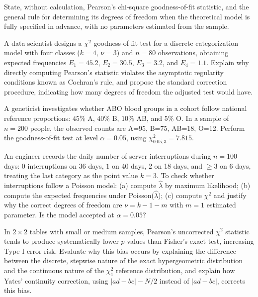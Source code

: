 \begin{problema}\label{prob:3f1ec07}
State, without calculation, Pearson's chi-square goodness-of-fit statistic, and the general rule for determining its degrees of freedom when the theoretical model is fully specified in advance, with no parameters estimated from the sample.
\end{problema}

\begin{problema}\label{prob:d4859df}
A data scientist designs a $\chi^2$ goodness-of-fit test for a discrete categorization model with four classes ($k=4$, $\nu=3$) and $n=80$ observations, obtaining expected frequencies $E_1=45.2$, $E_2=30.5$, $E_3=3.2$, and $E_4=1.1$. Explain why directly computing Pearson's statistic violates the asymptotic regularity conditions known as Cochran's rule, and propose the standard correction procedure, indicating how many degrees of freedom the adjusted test would have.
\end{problema}

\begin{problema}\label{prob:da2eb15}
A geneticist investigates whether ABO blood groups in a cohort follow national reference proportions: $45\%$ A, $40\%$ B, $10\%$ AB, and $5\%$ O. In a sample of $n=200$ people, the observed counts are A=95, B=75, AB=18, O=12. Perform the goodness-of-fit test at level $\alpha=0.05$, using $\chi^2_{0.05,3}=7.815$.
\end{problema}

\begin{problema}\label{prob:d6f0154}
An engineer records the daily number of server interruptions during $n=100$ days: $0$ interruptions on 36 days, $1$ on 40 days, $2$ on 18 days, and $\ge3$ on 6 days, treating the last category as the point value $k=3$. To check whether interruptions follow a Poisson model: (a) compute $\hat\lambda$ by maximum likelihood; (b) compute the expected frequencies under Poisson($\hat\lambda$); (c) compute $\chi^2$ and justify why the correct degrees of freedom are $\nu=k-1-m$ with $m=1$ estimated parameter. Is the model accepted at $\alpha=0.05$?
\end{problema}

\begin{problema}\label{prob:f622374}
In $2\times2$ tables with small or medium samples, Pearson's uncorrected $\chi^2$ statistic tends to produce systematically lower $p$-values than Fisher's exact test, increasing Type I error risk. Evaluate why this bias occurs by explaining the difference between the discrete, stepwise nature of the exact hypergeometric distribution and the continuous nature of the $\chi^2_1$ reference distribution, and explain how Yates' continuity correction, using $|ad-bc|-N/2$ instead of $|ad-bc|$, corrects this bias.
\end{problema}

